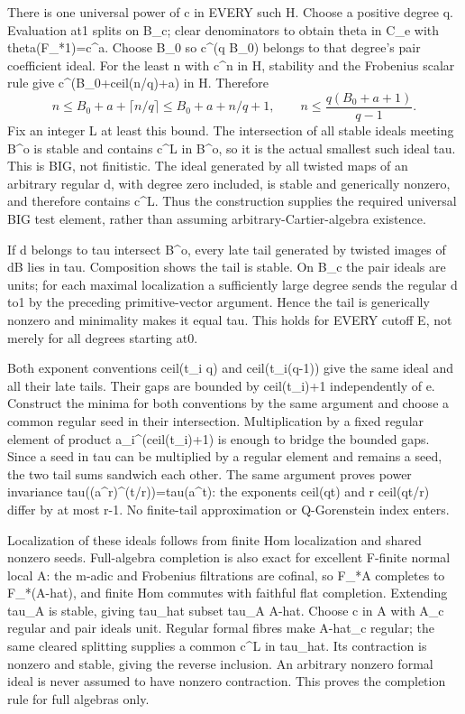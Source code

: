 \documentclass[11pt]{article}
\begin{document}
There is one universal power of c in EVERY such H. Choose a positive degree q. Evaluation at1 splits on B\_c; clear denominators to obtain theta in C\_e with theta(F\_*1)=c\textasciicircum{}a. Choose B\_0 so c\textasciicircum{}(q B\_0) belongs to that degree's pair coefficient ideal. For the least n with c\textasciicircum{}n in H, stability and the Frobenius scalar rule give c\textasciicircum{}(B\_0+ceil(n/q)+a) in H. Therefore
\[
n\le B_0+a+\lceil n/q\rceil\le B_0+a+n/q+1,
\qquad n\le\frac{q(B_0+a+1)}{q-1}.
\]
Fix an integer L at least this bound. The intersection of all stable ideals meeting B\textasciicircum{}o is stable and contains c\textasciicircum{}L in B\textasciicircum{}o, so it is the actual smallest such ideal tau. This is BIG, not finitistic. The ideal generated by all twisted maps of an arbitrary regular d, with degree zero included, is stable and generically nonzero, and therefore contains c\textasciicircum{}L. Thus the construction supplies the required universal BIG test element, rather than assuming arbitrary-Cartier-algebra existence.

If d belongs to tau intersect B\textasciicircum{}o, every late tail generated by twisted images of dB lies in tau. Composition shows the tail is stable. On B\_c the pair ideals are units; for each maximal localization a sufficiently large degree sends the regular d to1 by the preceding primitive-vector argument. Hence the tail is generically nonzero and minimality makes it equal tau. This holds for EVERY cutoff E, not merely for all degrees starting at0.

Both exponent conventions ceil(t\_i q) and ceil(t\_i(q-1)) give the same ideal and all their late tails. Their gaps are bounded by ceil(t\_i)+1 independently of e. Construct the minima for both conventions by the same argument and choose a common regular seed in their intersection. Multiplication by a fixed regular element of product a\_i\textasciicircum{}(ceil(t\_i)+1) is enough to bridge the bounded gaps. Since a seed in tau can be multiplied by a regular element and remains a seed, the two tail sums sandwich each other. The same argument proves power invariance tau((a\textasciicircum{}r)\textasciicircum{}(t/r))=tau(a\textasciicircum{}t): the exponents ceil(qt) and r ceil(qt/r) differ by at most r-1. No finite-tail approximation or Q-Gorenstein index enters.

Localization of these ideals follows from finite Hom localization and shared nonzero seeds. Full-algebra completion is also exact for excellent F-finite normal local A: the m-adic and Frobenius filtrations are cofinal, so F\_*A completes to F\_*(A-hat), and finite Hom commutes with faithful flat completion. Extending tau\_A is stable, giving tau\_hat subset tau\_A A-hat. Choose c in A with A\_c regular and pair ideals unit. Regular formal fibres make A-hat\_c regular; the same cleared splitting supplies a common c\textasciicircum{}L in tau\_hat. Its contraction is nonzero and stable, giving the reverse inclusion. An arbitrary nonzero formal ideal is never assumed to have nonzero contraction. This proves the completion rule for full algebras only.
\end{document}

